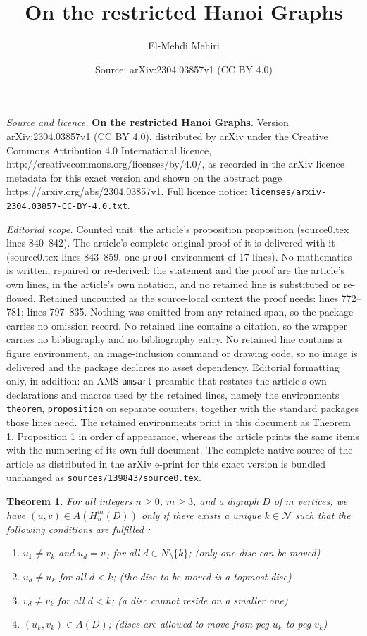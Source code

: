 \documentclass[10pt,a4paper]{amsart}
\title{\textbf{On the restricted Hanoi Graphs}}
\author{El-Mehdi Mehiri}
\date{Source: arXiv:2304.03857v1 (CC BY 4.0)}
\newtheorem{theorem}{Theorem}
\begin{document}
\maketitle

\noindent\emph{Source and licence.} \textbf{On the restricted Hanoi Graphs}. Version arXiv:2304.03857v1 (CC BY 4.0), distributed by arXiv under the Creative Commons Attribution 4.0 International licence, http://creativecommons.org/licenses/by/4.0/, as recorded in the arXiv licence metadata for this exact version and shown on the abstract page https://arxiv.org/abs/2304.03857v1. Full licence notice: \texttt{licenses/arxiv-2304.03857-CC-BY-4.0.txt}.\par\smallskip

\noindent\textit{Editorial scope.} Counted unit: the article's proposition proposition (source0.tex lines 840--842). The article's complete original proof of it is delivered with it (source0.tex lines 843--859, one \texttt{proof} environment of 17 lines). No mathematics is written, repaired or re-derived: the statement and the proof are the article's own lines, in the article's own notation, and no retained line is substituted or re-flowed.  Retained uncounted as the source-local context the proof needs: lines 772--781; lines 797--835.  Nothing was omitted from any retained span, so the package carries no omission record.  No retained line contains a citation, so the wrapper carries no bibliography and no bibliography entry.  No retained line contains a figure environment, an image-inclusion command or drawing code, so no image is delivered and the package declares no asset dependency.  Editorial formatting only, in addition: an AMS \texttt{amsart} preamble that restates the article's own declarations and macros used by the retained lines, namely the environments \texttt{theorem}, \texttt{proposition} on separate counters, together with the standard packages those lines need.  The retained environments print in this document as Theorem 1, Proposition 1 in order of appearance, whereas the article prints the same items with the numbering of its own full document.  The complete native source of the article as distributed in the arXiv e-print for this exact version is bundled unchanged as \texttt{sources/139843/source0.tex}.
\begin{theorem}
\label{theoremI} For all integers $n\geq0$, $m\geq 3$, and a digraph $D$ of $m$ vertices, we have  $(u,v)\in A(H_{n}^{m}(D))$ only if there exists a unique  $ k \in \mathcal{N}$ such that the following conditions are fulfilled :
\begin{enumerate}
    \item $u_{k}\neq v_{k}$ and  $u_{d}=v_{d}$ for all $d\in N\setminus\{k\}$; (only one disc can be moved)
    \item $u_{d}\neq u_{k}$  for all $d<k$; (the disc to be moved is a topmost disc) 
    \item  $v_{d}\neq v_{k}$ for all $d<k$; (a disc cannot reside on a smaller one) 
    \item $(u_{k},v_{k})\in A(D)$; (discs are allowed to move from peg $u_{k}$ to peg $v_{k}$)
\end{enumerate}
    
\end{theorem}
\end{document}
